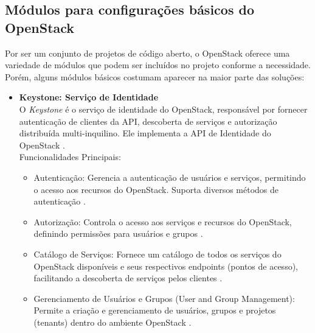 \begin{itemize}
\subsection{Módulos para configurações básicos do OpenStack}

Por ser um conjunto de projetos de código aberto, o OpenStack oferece uma variedade de módulos que podem ser incluídos no projeto conforme a necessidade. Porém, alguns módulos básicos costumam aparecer na maior parte das soluções:

\begin{itemize}
    \item \textbf{Keystone: Serviço de Identidade}\\
    O \textit{Keystone} é o serviço de identidade do OpenStack, responsável por fornecer autenticação de clientes da API, descoberta de serviços e autorização distribuída multi-inquilino. Ele implementa a API de Identidade do OpenStack \cite{openstack2025}.\\
    Funcionalidades Principais:
    \begin{itemize}
        \item Autenticação: Gerencia a autenticação de usuários e serviços, permitindo o acesso aos recursos do OpenStack. Suporta diversos métodos de autenticação \cite{openstack2025}.
        \item Autorização: Controla o acesso aos serviços e recursos do OpenStack, definindo permissões para usuários e grupos \cite{openstack2025}.
        \item Catálogo de Serviços: Fornece um catálogo de todos os serviços do OpenStack disponíveis e seus respectivos endpoints (pontos de acesso), facilitando a descoberta de serviços pelos clientes \cite{openstack2025}.
        \item Gerenciamento de Usuários e Grupos (User and Group Management): Permite a criação e gerenciamento de usuários, grupos e projetos (tenants) dentro do ambiente OpenStack \cite{openstack2025}.
    \end{itemize}


\end{itemize}
\end{itemize}
